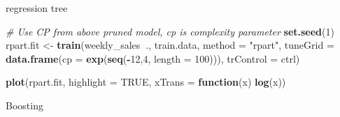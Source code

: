 \documentclass[]{article}
\newenvironment{Shaded}{\begin{snugshade}}{\end{snugshade}}
\newcommand{\CommentTok}[1]{\textcolor[rgb]{0.56,0.35,0.01}{\textit{#1}}}
\newcommand{\ControlFlowTok}[1]{\textcolor[rgb]{0.13,0.29,0.53}{\textbf{#1}}}
\newcommand{\DataTypeTok}[1]{\textcolor[rgb]{0.13,0.29,0.53}{#1}}
\newcommand{\DecValTok}[1]{\textcolor[rgb]{0.00,0.00,0.81}{#1}}
\newcommand{\FloatTok}[1]{\textcolor[rgb]{0.00,0.00,0.81}{#1}}
\newcommand{\KeywordTok}[1]{\textcolor[rgb]{0.13,0.29,0.53}{\textbf{#1}}}
\newcommand{\NormalTok}[1]{#1}
\newcommand{\OperatorTok}[1]{\textcolor[rgb]{0.81,0.36,0.00}{\textbf{#1}}}
\newcommand{\OtherTok}[1]{\textcolor[rgb]{0.56,0.35,0.01}{#1}}
\newcommand{\StringTok}[1]{\textcolor[rgb]{0.31,0.60,0.02}{#1}}
\begin{document}
\begin{Shaded}
\end{Shaded}

regression tree

\begin{Shaded}
\begin{Highlighting}[]
\CommentTok{# Use CP from above pruned model, cp is complexity parameter}
\KeywordTok{set.seed}\NormalTok{(}\DecValTok{1}\NormalTok{)}
\NormalTok{rpart.fit <-}\StringTok{ }\KeywordTok{train}\NormalTok{(weekly_sales}\OperatorTok{~}\NormalTok{., train.data,}
                   \DataTypeTok{method =} \StringTok{"rpart"}\NormalTok{,}
                   \DataTypeTok{tuneGrid =} \KeywordTok{data.frame}\NormalTok{(}\DataTypeTok{cp =} \KeywordTok{exp}\NormalTok{(}\KeywordTok{seq}\NormalTok{(}\OperatorTok{-}\DecValTok{12}\NormalTok{,}\DecValTok{4}\NormalTok{, }\DataTypeTok{length =} \DecValTok{100}\NormalTok{))),}
                   \DataTypeTok{trControl =}\NormalTok{ ctrl)}

\KeywordTok{plot}\NormalTok{(rpart.fit, }\DataTypeTok{highlight =} \OtherTok{TRUE}\NormalTok{, }\DataTypeTok{xTrans =} \ControlFlowTok{function}\NormalTok{(x) }\KeywordTok{log}\NormalTok{(x))}
\end{Highlighting}
\end{Shaded}

Boosting
\end{document}
